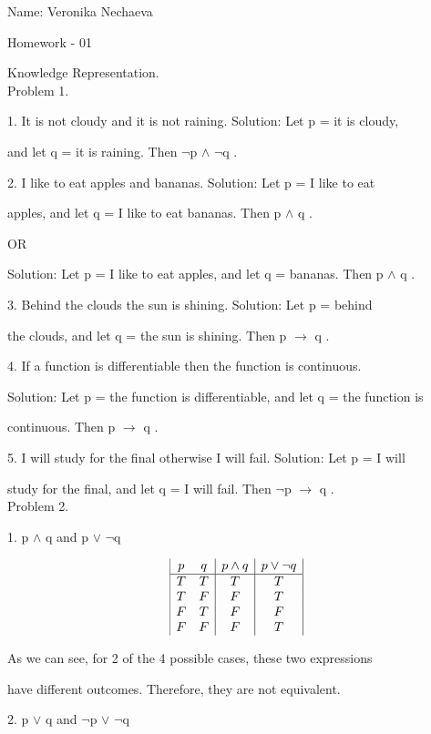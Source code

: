\documentclass[10pt]{article}
\begin{document}
Name: Veronika Nechaeva

Homework - 01

Knowledge Representation.\\[\baselineskip]  Problem 1.

1. It is not cloudy and it is not raining. Solution: Let p = it is cloudy, 

and let q = it is raining. 
Then $\neg$p $\land$ $\neg$q .

2.  I like to eat apples and bananas. Solution: Let p = I like to eat 

   apples, 
and let q = I like to eat bananas. Then p $\land$ q .

OR

Solution: Let p = I like to eat apples, and let q = bananas. 
Then p $\land$ q .

3. Behind the clouds the sun is shining. Solution: Let p = behind 

   the clouds, 
and let q = the sun is shining. Then p $\rightarrow$ q .

4. If a function is differentiable then the function is continuous.

Solution: Let p = the function is differentiable,
and let q = the function is 

continuous.
Then p $\rightarrow$ q .

5. I will study for the final otherwise I will fail.
Solution: Let p = I will 

study for the final, 
and let q = I will fail.
Then $\neg$p $\rightarrow$ q . \\[\baselineskip]
Problem 2.

1. p $\land$ q and p $\lor$ $\neg$q 

\begin{displaymath}
\begin{array}{|c c|c|c|}
p & q & p \land q & p \lor \neg q\\
\hline
T & T & T & T\\
T & F & F & T\\
F & T & F & F\\
F & F & F & T\\
\end{array}
\end{displaymath}

As we can see, for 2 of the 4 possible cases, these two expressions 

have different outcomes. Therefore, they are not equivalent.

2. p $\lor$ q and $\neg$p $\lor$ $\neg$q 
\end{document}
